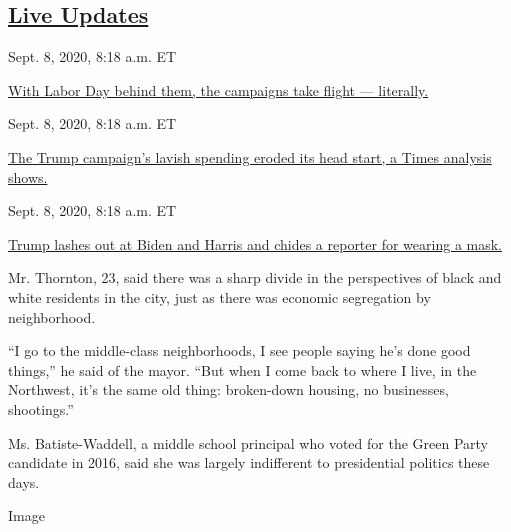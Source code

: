 \hypertarget{live-updates}{%
\subsection{\texorpdfstring{\href{https://www.nytimes3xbfgragh.onion/live/2020/09/08/us/trump-vs-biden}{Live
Updates}}{Live Updates}}\label{live-updates}}

\href{https://www.nytimes3xbfgragh.onion/live/2020/09/08/us/trump-vs-biden\#with-labor-day-behind-them-the-campaigns-take-flight-literally}{}

Sept. 8, 2020, 8:18 a.m. ET

\href{https://www.nytimes3xbfgragh.onion/live/2020/09/08/us/trump-vs-biden\#with-labor-day-behind-them-the-campaigns-take-flight-literally}{With
Labor Day behind them, the campaigns take flight ---
literally.}\href{https://www.nytimes3xbfgragh.onion/live/2020/09/08/us/trump-vs-biden\#the-trump-campaigns-lavish-spending-eroded-its-head-start-a-times-analysis-shows}{}

Sept. 8, 2020, 8:18 a.m. ET

\href{https://www.nytimes3xbfgragh.onion/live/2020/09/08/us/trump-vs-biden\#the-trump-campaigns-lavish-spending-eroded-its-head-start-a-times-analysis-shows}{The
Trump campaign's lavish spending eroded its head start, a Times analysis
shows.}\href{https://www.nytimes3xbfgragh.onion/live/2020/09/08/us/trump-vs-biden\#trump-lashes-out-at-biden-and-harris-and-chides-a-reporter-for-wearing-a-mask}{}

Sept. 8, 2020, 8:18 a.m. ET

\href{https://www.nytimes3xbfgragh.onion/live/2020/09/08/us/trump-vs-biden\#trump-lashes-out-at-biden-and-harris-and-chides-a-reporter-for-wearing-a-mask}{Trump
lashes out at Biden and Harris and chides a reporter for wearing a
mask.}

Mr. Thornton, 23, said there was a sharp divide in the perspectives of
black and white residents in the city, just as there was economic
segregation by neighborhood.

``I go to the middle-class neighborhoods, I see people saying he's done
good things,'' he said of the mayor. ``But when I come back to where I
live, in the Northwest, it's the same old thing: broken-down housing, no
businesses, shootings.''

Ms. Batiste-Waddell, a middle school principal who voted for the Green
Party candidate in 2016, said she was largely indifferent to
presidential politics these days.

Image

